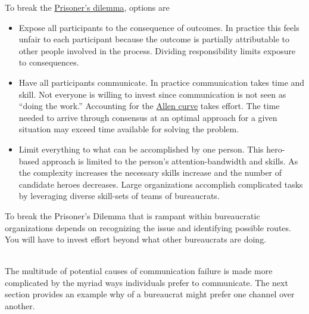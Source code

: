 To break the 
\href{https://en.wikipedia.org/wiki/Prisoner\%27s\_dilemma}{Prisoner's dilemma}, 
options are 
\begin{itemize}
    \item Expose all participants to the consequence of outcomes. In practice this feels unfair to each participant because the outcome is partially attributable to other people involved in the process. Dividing responsibility limits exposure to consequences.
    \item Have all participants communicate. In practice communication takes time and skill. Not everyone is willing to invest since communication is not seen as ``doing the work.'' Accounting for the \href{https://en.wikipedia.org/wiki/Allen\_curve}{Allen curve}
    takes effort. The time needed to arrive through consensus at an optimal approach for a given situation may exceed time available for solving the problem.
    \item Limit everything to what can be accomplished by one person. This hero-based approach is limited to the person's attention-bandwidth and skills. As the complexity increases the necessary skills increase and the number of candidate heroes decreases. Large organizations accomplish complicated tasks by leveraging diverse skill-sets of teams of bureaucrats.
\end{itemize}
To break the Prisoner's Dilemma that is rampant within bureaucratic organizations depends on recognizing the issue and identifying possible routes. You will have to invest effort beyond what other bureaucrats are doing.



\ \\


The multitude of potential causes of communication failure is made more complicated by the myriad ways individuals prefer to communicate. The next section provides an example why of a bureaucrat might prefer one channel over another. 
 
 